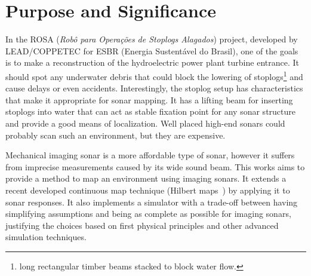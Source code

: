 \section{Purpose and Significance}



In the ROSA (\textit{Robô para Operações de Stoplogs Alagados}) project,
developed by LEAD/COPPETEC for ESBR (Energia Sustentável do Brasil), one of
the goals is to make a reconstruction of the hydroelectric power plant turbine
entrance. It should spot any underwater debris that could block the lowering of
stoplogs\footnote{long rectangular timber beams stacked to block water
flow.} and cause delays or even accidents.
Interestingly, the stoplog setup has characteristics that make it appropriate
for sonar mapping. It has a lifting beam for inserting stoplogs into
water that can act as stable fixation point for any sonar structure and
provide a good means of localization. Well placed high-end sonars could probably
scan such an environment, but they are expensive.

Mechanical imaging sonar is a more affordable type of sonar, however it suffers
from imprecise measurements caused by its wide sound beam. This works aims to
provide a method to map an environment using imaging sonars. It extends a recent
developed continuous map technique (Hilbert maps~\cite{ramos2016hilbert}) by
applying it to sonar responses. It also implements a simulator with a trade-off
between having simplifying assumptions and being as complete as possible for
imaging sonars, justifying the choices based on first physical principles and
other advanced simulation techniques.


% 
% 
